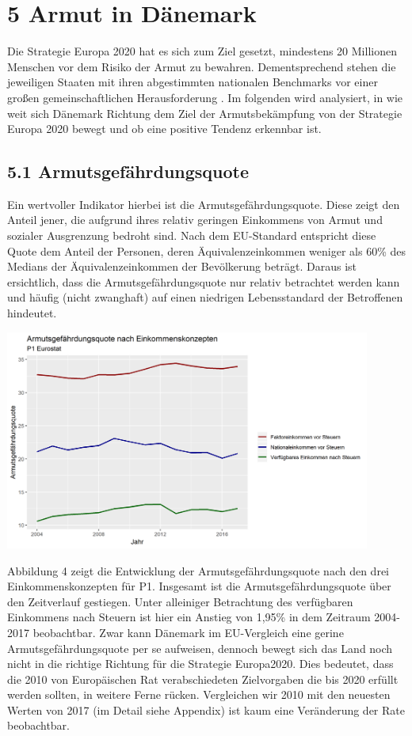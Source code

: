 \documentclass[ngerman,]{article}
\let\origfigure\figure
\let\endorigfigure\endfigure
\renewenvironment{figure}[1][2] {
        \expandafter\origfigure\expandafter[H]
      } {\endorigfigure}
\begin{document}
\section{5 Armut in Dänemark}\label{armut-in-danemark}

Die Strategie Europa 2020 hat es sich zum Ziel gesetzt, mindestens 20
Millionen Menschen vor dem Risiko der Armut zu bewahren. Dementsprechend
stehen die jeweiligen Staaten mit ihren abgestimmten nationalen
Benchmarks vor einer großen gemeinschaftlichen Herausforderung . Im
folgenden wird analysiert, in wie weit sich Dänemark Richtung dem Ziel
der Armutsbekämpfung von der Strategie Europa 2020 bewegt und ob eine
positive Tendenz erkennbar ist.

\subsection{5.1 Armutsgefährdungsquote}\label{armutsgefahrdungsquote}

Ein wertvoller Indikator hierbei ist die Armutsgefährdungsquote. Diese
zeigt den Anteil jener, die aufgrund ihres relativ geringen Einkommens
von Armut und sozialer Ausgrenzung bedroht sind. Nach dem EU-Standard
entspricht diese Quote dem Anteil der Personen, deren
Äquivalenzeinkommen weniger als 60\% des Medians der Äquivalenzeinkommen
der Bevölkerung beträgt. Daraus ist ersichtlich, dass die
Armutsgefährdungsquote nur relativ betrachtet werden kann und häufig
(nicht zwanghaft) auf einen niedrigen Lebensstandard der Betroffenen
hindeutet.

\begin{figure}
\centering
\includegraphics[width=0.90000\textwidth]{img/arpr.png}
\caption{Armutsgefährdungsquote, 2004-2017}
\end{figure}

Abbildung 4 zeigt die Entwicklung der Armutsgefährdungsquote nach den
drei Einkommenskonzepten für P1. Insgesamt ist die
Armutsgefährdungsquote über den Zeitverlauf gestiegen. Unter alleiniger
Betrachtung des verfügbaren Einkommens nach Steuern ist hier ein Anstieg
von 1,95\% in dem Zeitraum 2004-2017 beobachtbar. Zwar kann Dänemark im
EU-Vergleich eine gerine Armutsgefährdungsquote per se aufweisen,
dennoch bewegt sich das Land noch nicht in die richtige Richtung für die
Strategie Europa2020. Dies bedeutet, dass die 2010 von Europäischen Rat
verabschiedeten Zielvorgaben die bis 2020 erfüllt werden sollten, in
weitere Ferne rücken. Vergleichen wir 2010 mit den neuesten Werten von
2017 (im Detail siehe Appendix) ist kaum eine Veränderung der Rate
beobachtbar.
\end{document}
